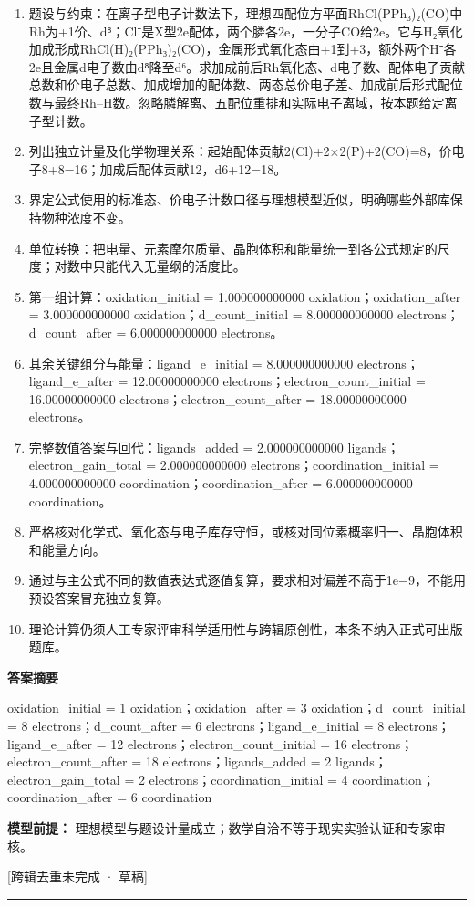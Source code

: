 \documentclass[UTF8,11pt,a4paper]{ctexart}
\begin{document}
\begin{enumerate}
\item 题设与约束：在离子型电子计数法下，理想四配位方平面RhCl(PPh₃)₂(CO)中Rh为+1价、d⁸；Cl⁻是X型2e配体，两个膦各2e，一分子CO给2e。它与H₂氧化加成形成RhCl(H)₂(PPh₃)₂(CO)，金属形式氧化态由+1到+3，额外两个H⁻各2e且金属d电子数由d⁸降至d⁶。求加成前后Rh氧化态、d电子数、配体电子贡献总数和价电子总数、加成增加的配体数、两态总价电子差、加成前后形式配位数与最终Rh–H数。忽略膦解离、五配位重排和实际电子离域，按本题给定离子型计数。
\item 列出独立计量及化学物理关系：起始配体贡献2(Cl)+2×2(P)+2(CO)=8，价电子8+8=16；加成后配体贡献12，d6+12=18。
\item 界定公式使用的标准态、价电子计数口径与理想模型近似，明确哪些外部库保持物种浓度不变。
\item 单位转换：把电量、元素摩尔质量、晶胞体积和能量统一到各公式规定的尺度；对数中只能代入无量纲的活度比。
\item 第一组计算：oxidation\_initial = 1.000000000000 oxidation；oxidation\_after = 3.000000000000 oxidation；d\_count\_initial = 8.000000000000 electrons；d\_count\_after = 6.000000000000 electrons。
\item 其余关键组分与能量：ligand\_e\_initial = 8.000000000000 electrons；ligand\_e\_after = 12.00000000000 electrons；electron\_count\_initial = 16.00000000000 electrons；electron\_count\_after = 18.00000000000 electrons。
\item 完整数值答案与回代：ligands\_added = 2.000000000000 ligands；electron\_gain\_total = 2.000000000000 electrons；coordination\_initial = 4.000000000000 coordination；coordination\_after = 6.000000000000 coordination。
\item 严格核对化学式、氧化态与电子库存守恒，或核对同位素概率归一、晶胞体积和能量方向。
\item 通过与主公式不同的数值表达式逐值复算，要求相对偏差不高于1e−9，不能用预设答案冒充独立复算。
\item 理论计算仍须人工专家评审科学适用性与跨辑原创性，本条不纳入正式可出版题库。
\end{enumerate}
\noindent\textbf{答案摘要}\par
oxidation\_initial = 1 oxidation；oxidation\_after = 3 oxidation；d\_count\_initial = 8 electrons；d\_count\_after = 6 electrons；ligand\_e\_initial = 8 electrons；ligand\_e\_after = 12 electrons；electron\_count\_initial = 16 electrons；electron\_count\_after = 18 electrons；ligands\_added = 2 ligands；electron\_gain\_total = 2 electrons；coordination\_initial = 4 coordination；coordination\_after = 6 coordination\par
\noindent\textbf{模型前提：}
理想模型与题设计量成立；数学自洽不等于现实实验认证和专家审核。\par
\noindent\textcolor{red!65!black}{[跨辑去重未完成 · 草稿]} \par
\medskip\hrule\medskip
{}
\end{document}
